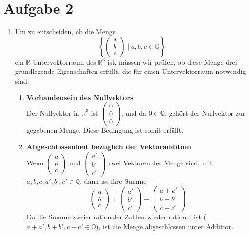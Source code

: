 \documentclass[a4paper]{scrartcl}
\begin{document}
\section*{Aufgabe 2}
\begin{enumerate}[label=\alph*)]
  \item Um zu entscheiden, ob die Menge 
  \[
  \left\{ \begin{pmatrix} a \\ b \\ c \end{pmatrix} \mid a, b, c \in \mathbb{Q} \right\}
  \]
  ein \(\mathbb{R}\)-Untervektorraum des \(\mathbb{R}^3\) ist, müssen wir prüfen, ob diese Menge drei grundlegende Eigenschaften erfüllt, die für einen Untervektorraum notwendig sind:
  
  \begin{enumerate}
      \item \textbf{Vorhandensein des Nullvektors}\\
      Der Nullvektor in \(\mathbb{R}^3\) ist \(\begin{pmatrix} 0 \\ 0 \\ 0 \end{pmatrix}\), und da \(0 \in \mathbb{Q}\), gehört der Nullvektor zur gegebenen Menge. Diese Bedingung ist somit erfüllt.
      
      \item \textbf{Abgeschlossenheit bezüglich der Vektoraddition}\\
      Wenn \(\begin{pmatrix} a \\ b \\ c \end{pmatrix}\) und \(\begin{pmatrix} a' \\ b' \\ c' \end{pmatrix}\) zwei Vektoren der Menge sind, mit \(a, b, c, a', b', c' \in \mathbb{Q}\), dann ist ihre Summe 
      \[
      \begin{pmatrix} a \\ b \\ c \end{pmatrix} + \begin{pmatrix} a' \\ b' \\ c' \end{pmatrix} = \begin{pmatrix} a+a' \\ b+b' \\ c+c' \end{pmatrix}
      \]
      Da die Summe zweier rationaler Zahlen wieder rational ist (\(a+a', b+b', c+c' \in \mathbb{Q}\)), ist die Menge abgeschlossen unter Addition.
      

\end{enumerate}
\end{enumerate}
\end{document}
